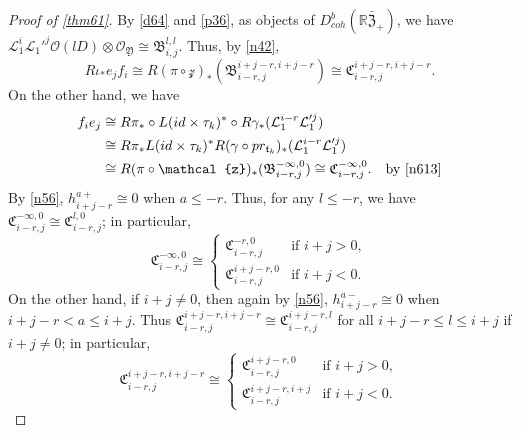 \documentclass{amsart}
\numberwithin{equation}{section}
\newcommand\mc{\mathcal}
\newcommand\mf{\mathfrak}
\newcommand\mb{\mathbb}
\theoremstyle{definition}
\theoremstyle{remark}
\begin{document}
\begin{proof}[Proof of \cref{thm61}]
  By \cref{d64} and \cref{p36}, as objects of $D_{coh}^{b}(\mb{R}\bar{\mf{Z}}_{+})$, we have $\mc{L}_{1}^{i}\mc{L}_{1}'^{j}\mc{O}(lD)\otimes \mc{O}_{\mf{Y}}\cong \mf{B}_{i,j}^{l,l}$. Thus, by \cref{n42},
\begin{equation}
  \label{eq:6022}
  R\iota_{*}e_{j}f_{i}\cong R(\pi\circ \mc{z})_{*}(\mf{B}_{i-r,j}^{i+j-r,i+j-r})\cong \mf{C}_{i-r,j}^{i+j-r,i+j-r}.
\end{equation}
On the other hand, we have
\begin{align}
\label{eq:6021}  f_{i}e_{j}&\cong R\pi_{*}\circ L(id\times \tau_{k})^{*}\circ R\gamma_{*}(\mc{L}^{i-r}_{1}\mc{L}_{1}'^{j}) & \\
            &\cong R\pi_{*}L(id\times \tau_{k})^{*}R(\gamma\circ pr_{\mf{t}_{k}})_{*}(\mc{L}^{i-r}_{1}\mc{L}_{1}'^{j}) \nonumber \\
            &\cong R(\pi\circ \mc{z})_{*}(\mf{B}_{i-r,j}^{-\infty,0})\cong \mf{C}_{i-r,j}^{-\infty,0}. & \text{by \cref{n613}} \nonumber
\end{align}
By \cref{n56}, $h_{i+j-r}^{a+}\cong 0$ when $a\leq -r$. Thus, for any $l\leq -r$, we have $\mf{C}_{i-r,j}^{-\infty,0}\cong \mf{C}_{i-r,j}^{l,0}$; in particular,
\begin{equation*}
  \mf{C}_{i-r,j}^{-\infty,0}\cong \begin{cases}
    \mf{C}_{i-r,j}^{-r,0} & \text{if } i+j>0, \\
    \mf{C}_{i-r,j}^{i+j-r,0} & \text{if } i+j<0.
  \end{cases}
\end{equation*}
On the other hand, if $i+j\neq 0$, then again by \cref{n56}, $h_{i+j-r}^{a-}\cong 0$ when $i+j-r<a\leq i+j$. Thus $\mf{C}_{i-r,j}^{i+j-r,i+j-r}\cong \mf{C}_{i-r,j}^{i+j-r,l}$ for all $i+j-r\leq l\leq i+j$ if $i+j\neq 0$; in particular,
\begin{equation*}
  \mf{C}_{i-r,j}^{i+j-r,i+j-r}\cong \begin{cases}
    \mf{C}_{i-r,j}^{i+j-r,0} & \text{if } i+j>0, \\
    \mf{C}_{i-r,j}^{i+j-r,i+j} & \text{if } i+j<0.
  \end{cases}
\end{equation*}


\end{proof}
\end{document}
